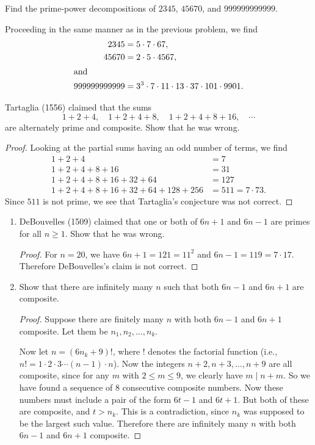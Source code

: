  Find the prime-power decompositions of $2345$, $45670$, and
$999999999999$.
\begin{solution}
  Proceeding in the same manner as in the previous problem, we find
  \begin{align*}
    2345 &= 5\cdot7\cdot67, \\
    45670 &= 2\cdot5\cdot4567, \\
    \intertext{and}
    999999999999
         &= 3^3\cdot7\cdot11\cdot13\cdot37\cdot101\cdot9901.
           \qedhere
  \end{align*}
\end{solution}

 Tartaglia (1556) claimed that the sums
\begin{equation*}
  1 + 2 + 4, \quad 1 + 2 + 4 + 8, \quad 1 + 2 + 4 + 8 + 16,\quad\cdots
\end{equation*}
are alternately prime and composite. Show that he was wrong.
\begin{proof}
  Looking at the partial sums having an odd number of terms, we find
  \begin{align*}
    1 + 2 + 4 &= 7 \\
    1 + 2 + 4 + 8 + 16 &= 31 \\
    1 + 2 + 4 + 8 + 16 + 32 + 64 &= 127 \\
    1 + 2 + 4 + 8 + 16 + 32 + 64 + 128 + 256 &= 511 = 7\cdot73.
  \end{align*}
  Since $511$ is not prime, we see that Tartaglia's conjecture was
  not correct.
\end{proof}

\begin{enumerate}
\item DeBouvelles (1509) claimed that one or both of $6n + 1$ and
  $6n - 1$ are primes for all $n\geq1$. Show that he was wrong.
  \begin{proof}
    For $n = 20$, we have $6n + 1 = 121 = 11^2$ and
    $6n - 1 = 119 = 7\cdot17$. Therefore DeBouvelles's claim is not
    correct.
  \end{proof}
\item Show that there are infinitely many $n$ such that both $6n-1$
  and $6n+1$ are composite.
  \begin{proof}
    Suppose there are finitely many $n$ with both $6n - 1$ and
    $6n + 1$ composite. Let them be $n_1, n_2, \dots, n_k$.

    Now let $n = (6n_k + 9)!$, where $!$ denotes the factorial
    function (i.e., $n! = 1\cdot2\cdot3\cdots(n-1)\cdot n$). Now the
    integers $n+2, n+3, \dots, n+9$ are all composite, since for any
    $m$ with $2\leq m\leq 9$, we clearly have $m \mid n + m$. So we
    have found a sequence of $8$ consecutive composite numbers. Now
    these numbers must include a pair of the form $6t - 1$ and
    $6t + 1$. But both of these are composite, and $t > n_k$. This is
    a contradiction, since $n_k$ was supposed to be the largest such
    value. Therefore there are infinitely many $n$ with both $6n-1$
    and $6n+1$ composite.
  \end{proof}
\end{enumerate}

